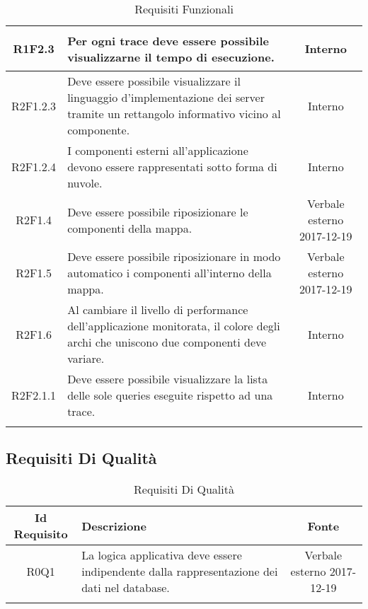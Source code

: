 \begin{longtable}{|c|H|c|}
\hypertarget{R1F2.3}{R1F2.3} & Per ogni trace deve essere possibile visualizzarne il tempo di esecuzione. & Interno \\ \hline 
\hypertarget{R2F1.2.3}{R2F1.2.3} & Deve essere possibile visualizzare il linguaggio d'implementazione dei server tramite un rettangolo informativo vicino al componente. & Interno \\ \hline 
\hypertarget{R2F1.2.4}{R2F1.2.4} & I componenti esterni all'applicazione devono essere rappresentati sotto forma di nuvole. & Interno \\ \hline 
\hypertarget{R2F1.4}{R2F1.4} & Deve essere possibile riposizionare le componenti della mappa. & Verbale esterno 2017-12-19 \\ \hline 
\hypertarget{R2F1.5}{R2F1.5} & Deve essere possibile riposizionare in modo automatico i componenti all'interno della mappa. & Verbale esterno 2017-12-19 \\ \hline 
\hypertarget{R2F1.6}{R2F1.6} & Al cambiare il livello di performance dell'applicazione monitorata, il colore degli archi che uniscono due componenti deve variare. & Interno \\ \hline 
\hypertarget{R2F2.1.1}{R2F2.1.1} & Deve essere possibile visualizzare la lista delle sole queries eseguite rispetto ad una trace. & Interno \\ \hline 
\caption[Requisiti Funzionali]{Requisiti Funzionali}
\label{tabella:req0}
\end{longtable}
\clearpage
\subsection{Requisiti Di Qualità}
\normalsize
\begin{longtable}{|c|H|c|}
\hline
\textbf{Id Requisito} & \textbf{Descrizione} & \textbf{Fonte}\\
\hline
\endhead
\hypertarget{R0Q1}{R0Q1} & La logica applicativa deve essere indipendente dalla rappresentazione dei dati nel database. & Verbale esterno 2017-12-19 \\ \hline 
\caption[Requisiti Di Qualità]{Requisiti Di Qualità}
\label{tabella:req1}
\end{longtable}
\clearpage
